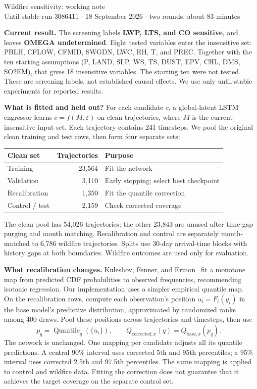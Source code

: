 \documentclass[11pt]{article}
\begin{document}
\begin{center}
{\Large Wildfire sensitivity: working note}\\[4pt]
Until-stable run 3086411 $\cdot$ 18 September 2026 $\cdot$ two rounds, about 83 minutes
\end{center}

\textbf{Current result.}
The screening labels \textbf{LWP, LTS, and CO sensitive}, and leaves
\textbf{OMEGA undetermined}. Eight tested variables enter the insensitive set:
PBLH, CFLOW, CFMID, SWGDN, LWC, RH, T, and PREC. Together with the ten starting
assumptions (P, LAND, SLP, WS, TS, DUST, EPV, CHL, DMS, SO2EM), that gives
18 insensitive variables. The starting ten were not tested. These are screening
labels, not established causal effects. We use only until-stable experiments for
reported results.

\textbf{What is fitted and held out?}
For each candidate $c$, a global-latent LSTM engressor learns
$c=f(M,\varepsilon)$ on clean trajectories, where $M$ is the current insensitive
input set. Each trajectory contains 241 timesteps. We pool the original clean
training and test rows, then form four separate sets:

\begin{center}
\begin{tabular}{lrl}
\toprule
Clean set & Trajectories & Purpose \\
\midrule
Training & 23,564 & Fit the network \\
Validation & 3,110 & Early stopping; select best checkpoint \\
Recalibration & 1,350 & Fit the quantile correction \\
Control / test & 2,159 & Check corrected coverage \\
\bottomrule
\end{tabular}
\end{center}

The clean pool has 54,026 trajectories; the other 23,843 are unused after time-gap
purging and month matching. Recalibration and control are separately month-matched
to 6,786 wildfire trajectories. Splits use 30-day arrival-time blocks with history
gaps at both boundaries. Wildfire outcomes are used only for evaluation.

\textbf{What recalibration changes.}
Kuleshov, Fenner, and Ermon~\cite{kuleshov2018} fit a monotone map from predicted
CDF probabilities to observed frequencies, recommending isotonic regression.
Our implementation uses a simpler empirical quantile map. On the recalibration
rows, compute each observation's position $u_i=F_i(y_i)$ in the base model's
predictive distribution, approximated by randomized ranks among 400 draws.
Pool these positions across trajectories and timesteps, then use
\[
 p_q=\operatorname{Quantile}_q(\{u_i\}),
 \qquad Q_{\mathrm{corrected},x}(q)=Q_{\mathrm{base},x}(p_q).
\]
The network is unchanged. One mapping per candidate adjusts all its quantile
predictions. A central 90\% interval uses corrected 5th and 95th percentiles;
a 95\% interval uses corrected 2.5th and 97.5th percentiles. The same mapping is
applied to control and wildfire data. Fitting the correction does not guarantee
that it achieves the target coverage on the separate control set.
\end{document}
